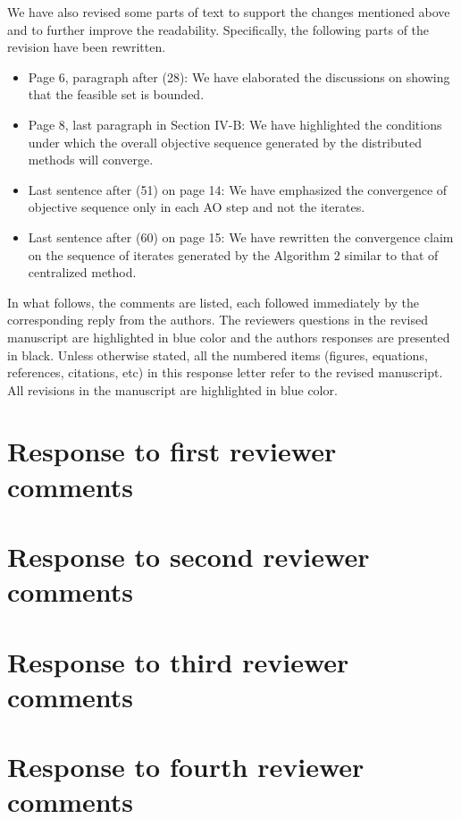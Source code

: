 \documentclass[10pt,letterpaper,onecolumn]{article}
\begin{document}
We have  also revised some parts of text to support the changes mentioned above and to further improve the readability. Specifically, the following parts of the revision have been rewritten.
\begin{itemize}
	\item Page 6, paragraph after (28): We have elaborated the discussions on showing that the feasible set is bounded.
	\item Page 8, last paragraph in Section IV-B: We have highlighted the conditions under which the overall objective sequence generated by the distributed methods will converge.
	\item Last sentence after (51) on page 14: We have emphasized the convergence of objective sequence only in each \ac{AO} step and not the iterates. 
	\item Last sentence after (60) on page 15: We have rewritten the convergence claim on the sequence of iterates generated by the Algorithm 2 similar to that of centralized method.
\end{itemize}

\vspace{1eM}
In what follows, the comments are listed, each followed immediately by the corresponding reply from the authors. The reviewers questions in the revised manuscript are highlighted in blue color and the authors responses are presented in black. Unless otherwise stated, all the numbered items (figures, equations, references, citations, etc) in this response letter refer to the revised manuscript. All revisions in the manuscript are highlighted in blue color.
\newpage
\section*{Response to first reviewer comments}


\newpage
\section*{Response to second reviewer comments}


\newpage
\section*{Response to third reviewer comments}


\newpage
\section*{Response to fourth reviewer comments}

\end{document}
